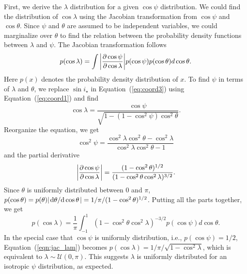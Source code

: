 \documentclass[twocolumn,times,linenumbers]{aastex631}
\begin{document}
First, we derive the $\lambda$ distribution for a given $\cos{\psi}$ distribution. We could find the distribution of $\cos{\lambda}$ using the Jacobian transformation from $\cos{\psi}$ and $\cos{\theta}$. Since $\psi$ and $\theta$ are assumed to be independent variables, we could marginalize over $\theta$ to find the relation between the probability density functions between $\lambda$ and $\psi$.
The Jacobian transformation follows
\begin{equation}
    p(\cos{\lambda}) = \int \abs{\pdv{\cos{\psi}}{\cos{\lambda}}} p(\cos{\psi}) p(\cos{\theta}) d\cos{\theta}.
\end{equation}
Here $p(x)$ denotes the probability density distribution of $x$.
To find $\psi$ in terms of $\lambda$ and $\theta$, we replace $\sin{i_\star}$ in Equation~(\ref{eq:coord3}) using Equation~(\ref{eq:coord1}) and find
\begin{equation}
    \cos{\lambda} = \frac{\cos{\psi}}{\sqrt{1-(1-\cos^2{\psi})\cos^2{\theta}}}.
\end{equation} 
Reorganize the equation, we get 
\begin{equation}
    \cos^2{\psi} = \frac{\cos^2{\lambda}\cos^2{\theta}-\cos^2{\lambda}}{\cos^2{\lambda}\cos^2{\theta}-1}
\end{equation}
and the partial derivative 
\begin{equation}
    \abs{\pdv{\cos{\psi}}{\cos{\lambda}}} = \frac{(1-\cos^2{\theta})^{1/2}}{(1-\cos^2{\theta}\cos^2{\lambda})^{3/2}}.
\end{equation}
Since $\theta$ is uniformly distributed between $0$ and $\pi$, $p(\cos{\theta}) = p(\theta) \abs{\dv*{\theta}{\cos{\theta}}} = 1/\pi/(1-\cos^2{\theta)^{1/2}}$. Putting all the parts together, we get
\begin{equation}\label{eqn:jac_lam}
    p(\cos{\lambda}) = \frac{1}{\pi} \int_{-1}^{1} (1-\cos^2{\theta}\cos^2{\lambda})^{-3/2} p(\cos{\psi}) d\cos{\theta}.
\end{equation}
In the special case that $\cos{\psi}$ is uniformly distribution, i.e., $p(\cos{\psi}) = 1/2$, Equation~(\ref{eqn:jac_lam}) becomes $p(\cos{\lambda}) = 1/\pi/\sqrt{1-\cos^2{\lambda}}$, which is equivalent to $\lambda \sim \mathcal{U}(0, \pi)$. This suggests $\lambda$ is uniformly distributed for an isotropic $\psi$ distribution, as expected.
\end{document}
